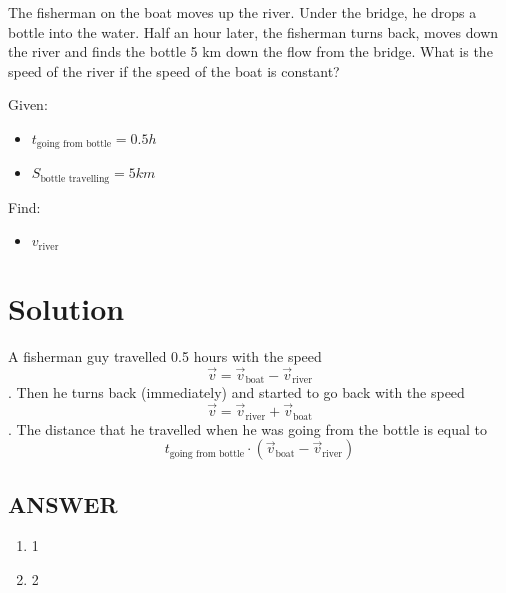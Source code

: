The fisherman on the boat moves up the river. Under the bridge, he drops a bottle into the water.
Half an hour later, the fisherman turns back, moves down the river and finds the bottle 5 km
down the flow from the bridge. What is the speed of the river if the speed of the boat is constant?

\bigbreak Given: \begin{itemize}
    \item $t_{\text{going from bottle}} = 0.5h$
    \item $S_{\text{bottle travelling}} = 5km$
\end{itemize}

Find: \begin{itemize}
    \item $v_{\text{river}}$
\end{itemize}

\section*{Solution}

A fisherman guy travelled 0.5 hours with the speed $$\Vec{v} = \Vec{v}_{\text{boat}} - \Vec{v}_{\text{river}}$$.
Then he turns back (immediately) and started to go back with the speed $$\Vec{v} = \Vec{v}_{\text{river}} + \Vec{v}_{\text{boat}}$$.
The distance that he travelled when he was going from the bottle is equal to $$t_{\text{going from bottle}} \cdot (\Vec{v}_{\text{boat}} - \Vec{v}_{\text{river}})$$



\vfill
\subsection*{ANSWER}
\begin{enumerate}
    \item 1
    \item 2
\end{enumerate}

